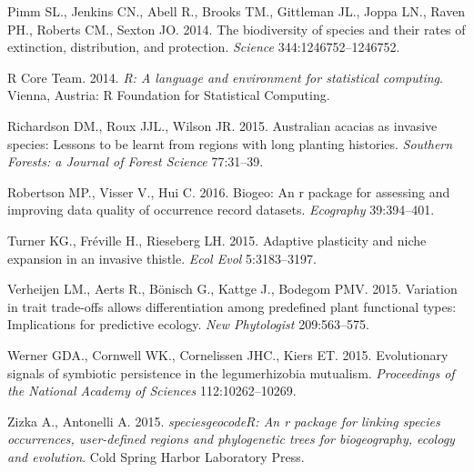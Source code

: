 \documentclass[author-year, review, 11pt]{components/elsarticle} %
\begin{document}
\hypertarget{ref-Pimm_2014}{}
Pimm SL., Jenkins CN., Abell R., Brooks TM., Gittleman JL., Joppa LN.,
Raven PH., Roberts CM., Sexton JO. 2014. The biodiversity of species and
their rates of extinction, distribution, and protection. \emph{Science}
344:1246752--1246752.

\hypertarget{ref-R}{}
R Core Team. 2014. \emph{R: A language and environment for statistical
computing}. Vienna, Austria: R Foundation for Statistical Computing.

\hypertarget{ref-Richardson_2015}{}
Richardson DM., Roux JJL., Wilson JR. 2015. Australian acacias as
invasive species: Lessons to be learnt from regions with long planting
histories. \emph{Southern Forests: a Journal of Forest Science}
77:31--39.

\hypertarget{ref-Robertson_2016}{}
Robertson MP., Visser V., Hui C. 2016. Biogeo: An r package for
assessing and improving data quality of occurrence record datasets.
\emph{Ecography} 39:394--401.

\hypertarget{ref-Turner_2015}{}
Turner KG., Fréville H., Rieseberg LH. 2015. Adaptive plasticity and
niche expansion in an invasive thistle. \emph{Ecol Evol} 5:3183--3197.

\hypertarget{ref-Verheijen_2015}{}
Verheijen LM., Aerts R., Bönisch G., Kattge J., Bodegom PMV. 2015.
Variation in trait trade-offs allows differentiation among predefined
plant functional types: Implications for predictive ecology. \emph{New
Phytologist} 209:563--575.

\hypertarget{ref-Werner_2015}{}
Werner GDA., Cornwell WK., Cornelissen JHC., Kiers ET. 2015.
Evolutionary signals of symbiotic persistence in the legumerhizobia
mutualism. \emph{Proceedings of the National Academy of Sciences}
112:10262--10269.

\hypertarget{ref-Zizka_2015}{}
Zizka A., Antonelli A. 2015. \emph{speciesgeocodeR: An r package for
linking species occurrences, user-defined regions and phylogenetic trees
for biogeography, ecology and evolution}. Cold Spring Harbor Laboratory
Press.
\end{document}
